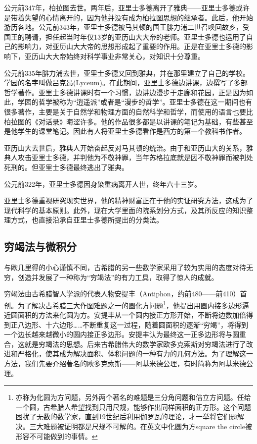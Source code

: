 \documentclass{article}
\begin{document}
公元前347年，柏拉图去世。两年后，亚里士多德离开了雅典——亚里士多德或许是带着失望的心情离开的，因为他并没有成为柏拉图思想的继承者。此后，他开始游历各地。公元前343年，亚里士多德被马其顿的国王腓力浦二世召唤回故乡，受国王的聘请，担任起当时年仅13岁的亚历山大大帝的老师。亚里士多德也运用了自己的影响力，对亚历山大大帝的思想形成起了重要的作用。正是在亚里士多德的影响下，亚历山大大帝始终对科学事业非常关心，对知识十分尊重。

公元前335年腓力浦去世，亚里士多德又回到雅典，并在那里建立了自己的学校。学园的名字叫做吕克昂(Lyceum)。在此期间，亚里士多德边讲课，边撰写了多部哲学著作。亚里士多德讲课时有一个习惯，边讲边漫步于走廊和花园，正是因为如此，学园的哲学被称为“逍遥派”或者是“漫步的哲学”。亚里士多德在这一期间也有很多著作，主要是关于自然学和物理方面的自然科学和哲学，而使用的语言也要比柏拉图的《对话录》晦涩许多。他的作品很多都是以讲课的笔记为基础，有些甚至是他学生的课堂笔记。因此有人将亚里士多德看作是西方的第一个教科书作者。

亚历山大去世后，雅典人开始奋起反对马其顿的统治。由于和亚历山大的关系，雅典人攻击亚里士多德，并判他为不敬神罪，当年苏格拉底就是因不敬神罪而被判处死刑的。但亚里士多德最终逃出了雅典。

公元前322年，亚里士多德因身染重病离开人世，终年六十三岁。

亚里士多德重视研究现实世界，他的精神财富正在于他的实证研究方法，这成为了现代科学的基本原则。此外，现在大学里面的院系划分方式，及其所反应的知识整理方式，也直接沿承自亚里士多德所提出的分类法。

\subsection{穷竭法与微积分}
与欧几里得的小心谨慎不同，古希腊的另一些数学家采用了较为实用的态度对待无穷，创造并发展了一种称为“穷竭法”的有力工具，取得了惊人的成就。

穷竭法由古希腊智人学派的代表人物安提丰（Antiphon，约前480——前410）首创。为了解决古希腊三大作图难题之一的圆化方问题\footnote{亦称为化圆为方问题，另外两个著名的难题是三分角问题和倍立方问题。任给一个圆，古希腊人希望找到只用尺规，能够作出同样面积的正方形。这个问题困扰了无数的数学家，直到19世纪后利用伽罗瓦的理论，才一举将它们题解决。三大难题被证明都是尺规不可解的。在英文中化圆为方square the circle被形容不可能做到的事情。}，他提出用圆内接多边形逼近圆面积的方法来化圆为方。安提丰从一个圆内接正方形开始，不断将边数加倍得到正八边形、十六边形……不断重复这一过程，随着圆面积的逐渐“穷竭”，将得到一个边长越来越微小的圆内接正多边形。安提丰认为最终这一正多边形将与圆重合，这就是穷竭法的思想。后来古希腊伟大的数学家欧多克索斯对穷竭法进行了改进和严格化，使其成为解决面积、体积问题的一种有力的几何方法。为了理解这一方法，我们先要介绍著名的欧多克索斯——阿基米德公理，有时简称为阿基米德公理。
\end{document}
